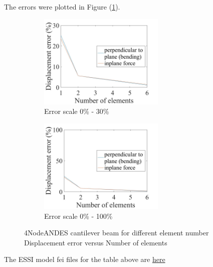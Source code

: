\documentclass[fleqn,11pt]{article}
\begin{document}

The errors were plotted in Figure (\ref{fig error 4NodeANDES cantilever beam for different element number}).

\begin{figure}[H]
  \begin{subfigure}{0.5\textwidth}
    \centering
    \includegraphics[width=6cm]{../Figure-files/error4andes_beam_different_element_number.jpeg}
    \caption{Error scale 0\% - 30\%}
  \end{subfigure}
  \begin{subfigure}{0.5\textwidth}
    \centering
    \includegraphics[width=6cm]{../Figure-files/error4andes_beam_different_element_number100.jpeg}
    \caption{Error scale 0\% - 100\%}
  \end{subfigure}
  \captionsetup{justification=centering,margin=2cm}
  \caption{4NodeANDES cantilever beam for different element number\\
    Displacement error   versus   Number of elements}
  \label{fig error 4NodeANDES cantilever beam for different element number}
\end{figure}


The ESSI model fei files for the table above are \href{https://github.com/yuan-energy/ESSI_Verification/blob/master/4NodeANDES/cantilever_different_element_number/cantilever_different_element_number.tar.gz?raw=true}{here}
\end{document}
